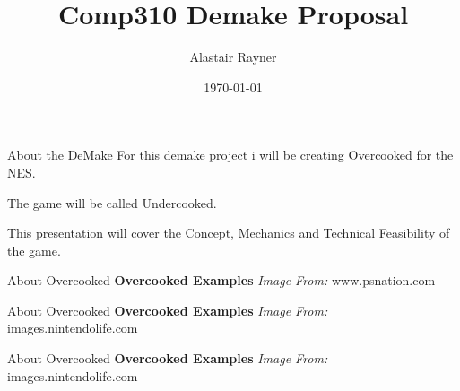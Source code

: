 \documentclass{beamer}
\title{Comp310 Demake Proposal}
\author{Alastair Rayner}
\date{\today}
\begin{document}
\maketitle


\begin{frame}{About the DeMake}
	  For this demake project i will be creating Overcooked for the NES. \pause
	  
	  The game will be called Undercooked.\pause
	  
	 This presentation will cover the Concept, Mechanics and Technical Feasibility of the game.
\end{frame}

\begin{frame}{About Overcooked}
    \textbf{Overcooked Examples}
    \textit{Image From:} www.psnation.com
\end{frame}

\begin{frame}{About Overcooked}
    \textbf{Overcooked Examples}
    \textit{Image From:} images.nintendolife.com
\end{frame}

\begin{frame}{About Overcooked}
    \textbf{Overcooked Examples}
   \textit{Image From:} images.nintendolife.com
\end{frame}
\end{document}
